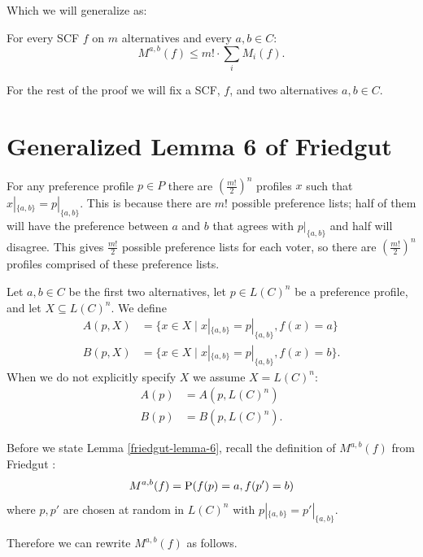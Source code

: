 	Which we will generalize as:

	\begin{theorem}
		For every SCF $f$ on $m$ alternatives and every $a, b \in C$:
		\[
			M^{a, b}(f) \le m! \cdot \sum_i M_i(f).
		\]
	\end{theorem}

	For the rest of the proof we will fix a SCF, $f$, and two alternatives $a, b \in C$.


\section{Generalized Lemma 6 of Friedgut}

	For any preference profile $p \in P$ there are $(\frac{m!}{2})^n$ profiles $x$ such that $x|_{\{a, b\}} = p|_{\{a, b\}}$. This is because there are $m!$ possible preference lists; half of them will have the preference between $a$ and $b$ that agrees with $p|_{\{a, b\}}$ and half will disagree. This gives $\frac{m!}{2}$ possible preference lists for each voter, so there are $(\frac{m!}{2})^n$ profiles comprised of these preference lists.

	\begin{definition}
		Let $a, b \in C$ be the first two alternatives, let $p \in L(C)^n$ be a preference profile, and let $X \subseteq L(C)^n$. We define
		\begin{align*}
			A(p, X) &= \{x \in X \mid x|_{\{a,b\}} = p|_{\{a,b\}}, f(x) = a\} \\
			B(p, X) &= \{x \in X \mid x|_{\{a,b\}} = p|_{\{a,b\}}, f(x) = b\}.
		\end{align*}
		When we do not explicitly specify $X$ we assume $X = L(C)^n$:
		\begin{align*}
			A(p) &= A(p, L(C)^n) \\
			B(p) &= B(p, L(C)^n).
		\end{align*}
	\end{definition}

	Before we state Lemma \ref{friedgut-lemma-6}, recall the definition of $M^{a,b}(f)$ from Friedgut \cite{friedgut2008elections}:
	\[
		M^{a,b}(f) = \operatorname{P}(f(p) = a, f(p') = b)
	\]
	where $p, p'$ are chosen at random in $L(C)^n$ with $p|_{\{a,b\}} = p'|_{\{a,b\}}$.

	Therefore we can rewrite $M^{a,b}(f)$ as follows.

